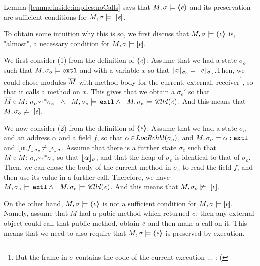 \documentclass[acmsmall,review,anonymous,screen]{acmart}\settopmatter{printfolios=true,printacmref=false}
\begin{document}
Lemma \ref{lemma:inside:implies:noCalls} says that $\satisfiesA{M}{\sigma} {\inside {\re}} $ and its preservation are sufficient conditions for $M, \sigma \models \  \insidef{\re}$. 

To obtain some intuition why this is so, we first discuss that $\satisfiesA{M}{\sigma} {\inside {\re}} $ is, 
"almost",  a necessary condition for $\satisfiesA{M}{\sigma} {\insidef {\re}} $. 

We first consider (1) from the definition of $ {\inside {\re}}$:
Assume that we had a state $\sigma_o$ such that $\satisfiesA{M}{\sigma_o}{\extThis}$ and with  a variable $x$ so that  $\interpret {\sigma_o} x  = \interpret {\sigma_o} \re $.Then, we could chose modules $\Mtwo$ with method body for the current, external, receiver\footnote{But the frame in $\sigma$ contains the code of the current execution ... :-( }, so that it calls a method on $x$. This gives that we obtain a $\sigma_e'$ so that
$\leadstoBoundedStar  {\Mtwo\circ M} {\sigma_o} {\sigma_e}\ \ \wedge\ \ M, \sigma_e\models \,  \extThis
\wedge\ \ M, \sigma_e \models \,   \callsOn {\re}$. And this means that $M, \sigma_o \not\models \  \insidef{\re}$.

We now consider (2) from the definition of $ {\inside {\re}}$:
Assume that we had a state $\sigma_o$ and an address $\alpha$ and a field $f$, so that $\alpha\!\in\!{\LRelevantO {\sigma_o}}$, and $\satisfiesA{M}{\sigma_o}{\external {\alpha}}$ and  
$\interpret {\sigma_o} {\alpha.f}\! \neq \! \interpret {\sigma} {\re}$. 
Assume that there is a further state $\sigma_e$ such that   $\leadstoBoundedStar  {\Mtwo\circ M} {\sigma_o} {\sigma_e}$ so that $\interpret {\sigma} {\alpha}$, and that the heap of $\sigma_e$ is identical to that of $\sigma_o$. Then, we can chose the body of the current method in $\sigma_e$ to read the field $f$, and then use its value in a further call. Therefore, we have $M, \sigma_e \models \,  \extThis
\wedge\ \ M, \sigma_e \models \,   \callsOn {\re}$. And this means that $M, \sigma_o \not\models \  \insidef{\re}$.

On the other hand, $\satisfiesA{M}{\sigma} {\inside {\re}} $ is not a sufficient condition for $\satisfiesA{M}{\sigma} {\insidef {\re}} $.
Namely, assume that $M$ had a pubic method which returned $\re$; then any external object could call that public method, obtain $\re$ and then make a call on it.
This means that we need to also  require that $\satisfiesA{M}{\sigma} {\inside {\re}} $ is preserved by execution.
\end{document}
